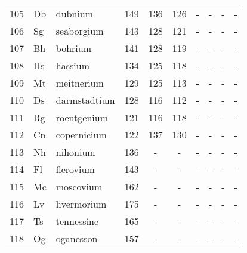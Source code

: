 \documentclass[   %
  final,          %
  a4paper,        %
  8pt
]{extarticle}
\begin{document}
\begin{ThreePartTable}
\begin{longtable}{rll*{7}{S[table-format=3.1, table-space-text-post = , table-align-text-post = false]}}
105  & Db   & dubnium       & 149   & 136   & 126   & {-}   & {-}          & {-}        & {-}     \\
106  & Sg   & seaborgium    & 143   & 128   & 121   & {-}   & {-}          & {-}        & {-}     \\
107  & Bh   & bohrium       & 141   & 128   & 119   & {-}   & {-}          & {-}        & {-}     \\
108  & Hs   & hassium       & 134   & 125   & 118   & {-}   & {-}          & {-}        & {-}     \\
109  & Mt   & meitnerium    & 129   & 125   & 113   & {-}   & {-}          & {-}        & {-}     \\
110  & Ds   & darmstadtium  & 128   & 116   & 112   & {-}   & {-}          & {-}        & {-}     \\
111  & Rg   & roentgenium   & 121   & 116   & 118   & {-}   & {-}          & {-}        & {-}     \\
112  & Cn   & copernicium   & 122   & 137   & 130   & {-}   & {-}          & {-}        & {-}     \\
113  & Nh   & nihonium      & 136   & {-}   & {-}   & {-}   & {-}          & {-}        & {-}     \\
114  & Fl   & flerovium     & 143   & {-}   & {-}   & {-}   & {-}          & {-}        & {-}     \\
115  & Mc   & moscovium     & 162   & {-}   & {-}   & {-}   & {-}          & {-}        & {-}     \\
116  & Lv   & livermorium   & 175   & {-}   & {-}   & {-}   & {-}          & {-}        & {-}     \\
117  & Ts   & tennessine    & 165   & {-}   & {-}   & {-}   & {-}          & {-}        & {-}     \\
118  & Og   & oganesson     & 157   & {-}   & {-}   & {-}   & {-}          & {-}        & {-}     \\
\end{longtable}
\end{ThreePartTable}

\printbibliography
\end{document}
